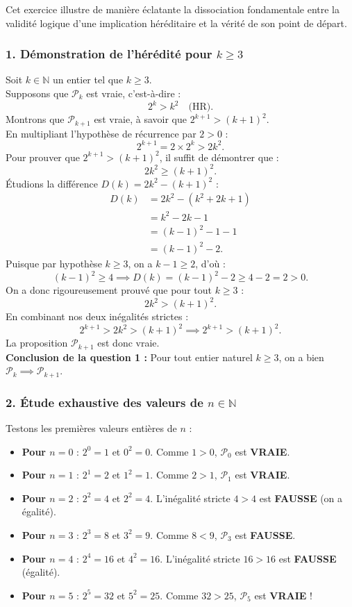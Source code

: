 \documentclass[11pt,a4paper]{article}
\newcommand{\N}{\mathbb{N}}
\begin{document}
\begin{correctionbox}
Cet exercice illustre de manière éclatante la dissociation fondamentale entre la validité logique d'une implication héréditaire et la vérité de son point de départ.

\subsubsection*{1. Démonstration de l'hérédité pour $k \ge 3$}

Soit $k \in \N$ un entier tel que $k \ge 3$.\\
Supposons que $\mathcal{P}_k$ est vraie, c'est-à-dire :
\[
2^k > k^2 \quad \text{(HR)}.
\]
Montrons que $\mathcal{P}_{k+1}$ est vraie, à savoir que $2^{k+1} > (k+1)^2$.\\
En multipliant l'hypothèse de récurrence par $2 > 0$ :
\[
2^{k+1} = 2 \times 2^k > 2k^2.
\]
Pour prouver que $2^{k+1} > (k+1)^2$, il suffit de démontrer que :
\[
2k^2 \ge (k+1)^2.
\]
Étudions la différence $D(k) = 2k^2 - (k+1)^2$ :
\begin{align*}
D(k) &= 2k^2 - (k^2 + 2k + 1) \\
     &= k^2 - 2k - 1 \\
     &= (k - 1)^2 - 1 - 1 \\
     &= (k - 1)^2 - 2.
\end{align*}
Puisque par hypothèse $k \ge 3$, on a $k - 1 \ge 2$, d'où :
\[
(k - 1)^2 \ge 4 \implies D(k) = (k - 1)^2 - 2 \ge 4 - 2 = 2 > 0.
\]
On a donc rigoureusement prouvé que pour tout $k \ge 3$ :
\[
2k^2 > (k+1)^2.
\]
En combinant nos deux inégalités strictes :
\[
2^{k+1} > 2k^2 > (k+1)^2 \implies 2^{k+1} > (k+1)^2.
\]
La proposition $\mathcal{P}_{k+1}$ est donc vraie.\\
\textbf{Conclusion de la question 1 :} Pour tout entier naturel $k \ge 3$, on a bien $\mathcal{P}_k \implies \mathcal{P}_{k+1}$.

\subsubsection*{2. Étude exhaustive des valeurs de $n \in \N$}

Testons les premières valeurs entières de $n$ :
\begin{itemize}
    \item \textbf{Pour $n = 0$} : $2^0 = 1$ et $0^2 = 0$. Comme $1 > 0$, $\mathcal{P}_0$ est \textbf{VRAIE}.
    \item \textbf{Pour $n = 1$} : $2^1 = 2$ et $1^2 = 1$. Comme $2 > 1$, $\mathcal{P}_1$ est \textbf{VRAIE}.
    \item \textbf{Pour $n = 2$} : $2^2 = 4$ et $2^2 = 4$. L'inégalité stricte $4 > 4$ est \textbf{FAUSSE} (on a égalité).
    \item \textbf{Pour $n = 3$} : $2^3 = 8$ et $3^2 = 9$. Comme $8 < 9$, $\mathcal{P}_3$ est \textbf{FAUSSE}.
    \item \textbf{Pour $n = 4$} : $2^4 = 16$ et $4^2 = 16$. L'inégalité stricte $16 > 16$ est \textbf{FAUSSE} (égalité).
    \item \textbf{Pour $n = 5$} : $2^5 = 32$ et $5^2 = 25$. Comme $32 > 25$, $\mathcal{P}_5$ est \textbf{VRAIE} !
\end{itemize}


\end{correctionbox}
\end{document}
